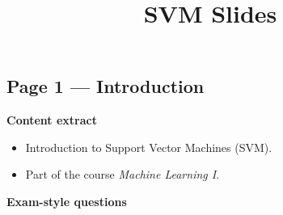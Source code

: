\documentclass[12pt]{article}
\begin{document}
	
	\title{SVM Slides}
	\author{}
	\date{}
	\maketitle


\subsection*{Page 1 — Introduction}

\textbf{Content extract}
\begin{itemize}
	\item Introduction to Support Vector Machines (SVM).
	\item Part of the course \emph{Machine Learning I}.
\end{itemize}

\textbf{Exam-style questions}
\end{document}

